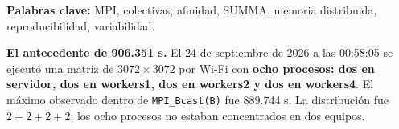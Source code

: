 \medskip
\noindent\textbf{Palabras clave:} MPI, colectivas, afinidad, SUMMA, memoria distribuida, reproducibilidad, variabilidad.

\begin{idea}
\textbf{El antecedente de 906.351 s.} El 24 de septiembre de 2026 a las 00:58:05 se ejecutó una matriz de $3072\times3072$ por Wi-Fi con \textbf{ocho procesos: dos en servidor, dos en workers1, dos en workers2 y dos en workers4}. El máximo observado dentro de \texttt{MPI\_Bcast(B)} fue 889.744 s. La distribución fue $2+2+2+2$; los ocho procesos no estaban concentrados en dos equipos.
\end{idea}
